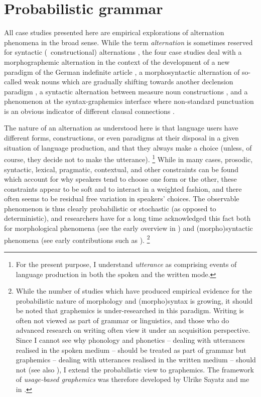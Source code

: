 \chapter{Probabilistic grammar}
\label{sec:probabilisticgrammar}

All case studies presented here are empirical explorations of alternation phenomena in the broad sense.
While the term \textit{alternation} is sometimes reserved for syntactic (\ie\ constructional) alternations \citep{Gries2017a}, the four case studies deal with a morphographemic alternation in the context of the development of a new paradigm of the German indefinite article \RDefArt, a morphosyntactic alternation of so-called weak nouns which are gradually shifting towards another declension paradigm \RWeakN, a syntactic alternation between measure noun constructions \RMeasure, and a phenomenon at the syntax-graphemics interface where non-standard punctuation is an obvious indicator of different clausal connections \RWeil.

The nature of an alternation as understood here is that language users have different forms, constructions, or even paradigms at their disposal in a given situation of language production, and that they always make a choice (unless, of course, they decide not to make the utterance).%
\footnote{For the present purpose, I understand \textit{utterance} as comprising events of language production in both the spoken and the written mode.}
While in many cases, prosodic, syntactic, lexical, pragmatic, contextual, and other constraints can be found which account for why speakers tend to choose one form or the other, these constraints appear to be soft and to interact in a weighted fashion, and there often seems to be residual free variation in speakers' choices.
The observable phenomenon is thus clearly probabilistic or stochastic (as opposed to deterministic), and researchers have for a long time acknowledged this fact both for morphological phenomena (see the early overview in \citealt{HayBaayen2005}) and (morpho)syntactic phenomena (see early contributions such as \citealt{Gries2003,Wulff2003,Bresnan2007,Bresnan2007}).%
\footnote{While the number of studies which have produced empirical evidence for the probabilistic nature of morphology and (morpho)syntax is growing, it should be noted that graphemics is under-researched in this paradigm.
Writing is often not viewed as part of grammar or linguistics, and those who do advanced research on writing often view it under an acquisition perspective.
Since I cannot see why phonology and phonetics -- dealing with utterances realised in the spoken medium -- should be treated as part of grammar but graphemics -- dealing with utterances realised in the written medium -- should not (see also \citealt[495--500]{Schaefer2016e}), I extend the probabilistic view to graphemics.
The framework of \textit{usage-based graphemics} was therefore developed by Ulrike Sayatz and me in \ROWeil.
}

